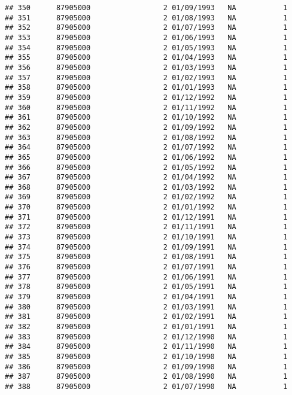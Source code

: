\documentclass[
]{article}
\begin{document}
\begin{verbatim}
## 350      87905000                 2 01/09/1993   NA           1
## 351      87905000                 2 01/08/1993   NA           1
## 352      87905000                 2 01/07/1993   NA           1
## 353      87905000                 2 01/06/1993   NA           1
## 354      87905000                 2 01/05/1993   NA           1
## 355      87905000                 2 01/04/1993   NA           1
## 356      87905000                 2 01/03/1993   NA           1
## 357      87905000                 2 01/02/1993   NA           1
## 358      87905000                 2 01/01/1993   NA           1
## 359      87905000                 2 01/12/1992   NA           1
## 360      87905000                 2 01/11/1992   NA           1
## 361      87905000                 2 01/10/1992   NA           1
## 362      87905000                 2 01/09/1992   NA           1
## 363      87905000                 2 01/08/1992   NA           1
## 364      87905000                 2 01/07/1992   NA           1
## 365      87905000                 2 01/06/1992   NA           1
## 366      87905000                 2 01/05/1992   NA           1
## 367      87905000                 2 01/04/1992   NA           1
## 368      87905000                 2 01/03/1992   NA           1
## 369      87905000                 2 01/02/1992   NA           1
## 370      87905000                 2 01/01/1992   NA           1
## 371      87905000                 2 01/12/1991   NA           1
## 372      87905000                 2 01/11/1991   NA           1
## 373      87905000                 2 01/10/1991   NA           1
## 374      87905000                 2 01/09/1991   NA           1
## 375      87905000                 2 01/08/1991   NA           1
## 376      87905000                 2 01/07/1991   NA           1
## 377      87905000                 2 01/06/1991   NA           1
## 378      87905000                 2 01/05/1991   NA           1
## 379      87905000                 2 01/04/1991   NA           1
## 380      87905000                 2 01/03/1991   NA           1
## 381      87905000                 2 01/02/1991   NA           1
## 382      87905000                 2 01/01/1991   NA           1
## 383      87905000                 2 01/12/1990   NA           1
## 384      87905000                 2 01/11/1990   NA           1
## 385      87905000                 2 01/10/1990   NA           1
## 386      87905000                 2 01/09/1990   NA           1
## 387      87905000                 2 01/08/1990   NA           1
## 388      87905000                 2 01/07/1990   NA           1

\end{verbatim}
\end{document}
